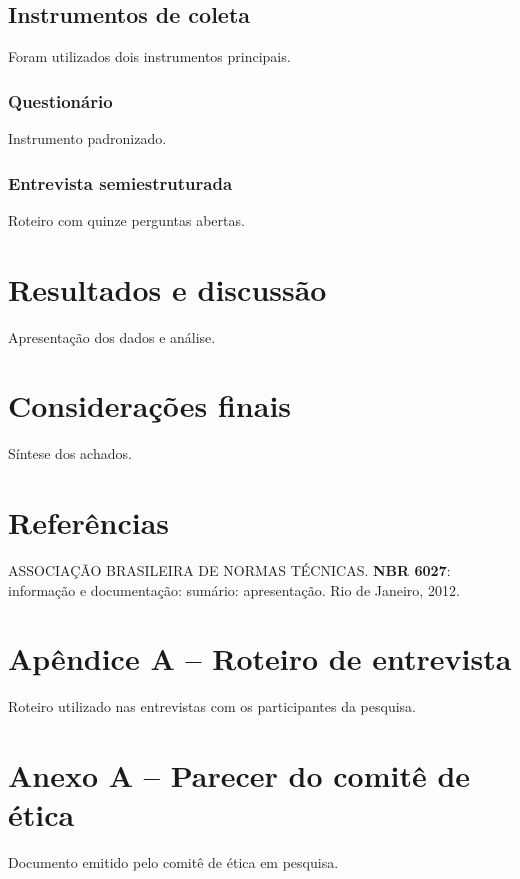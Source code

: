 \documentclass[a4paper, 12pt]{report}
\begin{document}
\section{Instrumentos de coleta}

Foram utilizados dois instrumentos principais.

\subsection{Questionário}

Instrumento padronizado.

\subsection{Entrevista semiestruturada}

Roteiro com quinze perguntas abertas.

\chapter{Resultados e discussão}

Apresentação dos dados e análise.

\chapter{Considerações finais}

Síntese dos achados.

\chapter*{Referências}

ASSOCIAÇÃO BRASILEIRA DE NORMAS TÉCNICAS. \textbf{NBR 6027}: informação e
documentação: sumário: apresentação. Rio de Janeiro, 2012.

\chapter*{Apêndice A -- Roteiro de entrevista}

Roteiro utilizado nas entrevistas com os participantes da pesquisa.

\chapter*{Anexo A -- Parecer do comitê de ética}

Documento emitido pelo comitê de ética em pesquisa.
\end{document}
